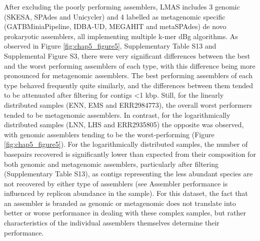 After excluding the poorly performing assemblers, LMAS includes 3 genomic (SKESA, SPAdes and Unicycler) and 4 labelled as metagenomic specific (GATBMiniaPipeline, IDBA-UD, MEGAHIT and metaSPAdes) de novo prokaryotic assemblers, all implementing multiple k-mer \ac{dBg} algorithms. As observed in Figure \ref{fig:chap5_figure5}, Supplementary Table S13 and Supplemental Figure S3,  there were very significant differences between the best and the worst performing assemblers of each type, with this difference being more pronounced for metagenomic assemblers. The best performing assemblers of each type behaved frequently quite similarly, and the differences between them tended to be attenuated after filtering for contigs <1 k\ac{bp}. Still, for the linearly distributed samples (ENN, EMS and ERR2984773), the overall worst performers tended to be metagenomic assemblers. In contrast, for the logarithmically distributed samples (LNN, LHS and ERR2935805) the opposite was observed, with genomic assemblers tending to be the worst-performing (Figure \ref{fig:chap5_figure5}). For the logarithmically distributed samples, the number of basepairs recovered is significantly lower than expected from their composition for both genomic and metagenomic assemblers, particularly after filtering (Supplementary Table S13), as contigs representing the less abundant species are not recovered by either type of assemblers (see Assembler performance is influenced by replicon abundance in the sample). For this dataset, the fact that an assembler is branded as genomic or metagenomic does not translate into better or worse performance in dealing with these complex samples, but rather characteristics of the individual assemblers themselves determine their performance.


